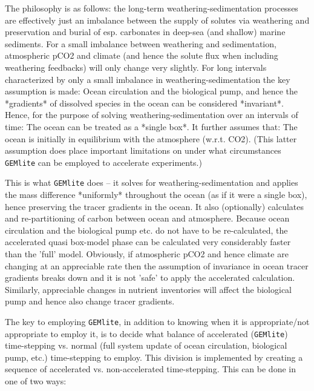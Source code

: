 \documentclass[11pt,fleqn]{book} %
\begin{document}
The philosophy is as follows: the long-term weathering-sedimentation processes are effectively just an imbalance between the supply of solutes via weathering and preservation and burial of esp. carbonates in deep-sea (and shallow) marine sediments. For a small imbalance between weathering and sedimentation, atmospheric pCO2 and climate (and hence the solute flux when including weathering feedbacks) will only change very slightly. For long intervals characterized by only a small imbalance in weathering-sedimentation the key assumption is made:
Ocean circulation and the biological pump, and hence the *gradients* of dissolved species in the ocean can be considered *invariant*.
Hence, for the purpose of solving weathering-sedimentation over an intervals of time:
The ocean can be treated as a *single box*.
It further assumes that:
The ocean is initially in equilibrium with the atmosphere (w.r.t. CO2).
(This latter assumption does place important limitations on under what circumstances \texttt{GEMlite} can be employed to accelerate experiments.)

This is what \texttt{GEMlite} does -- it solves for weathering-sedimentation and applies the mass difference *uniformly* throughout the ocean (as if it were a single box), hence preserving the tracer gradients in the ocean. It also (optionally) calculates and re-partitioning of carbon between ocean and atmosphere. Because ocean circulation and the biological pump etc. do not have to be re-calculated, the accelerated quasi box-model phase can be calculated very considerably faster than the 'full' model.
Obviously, if atmospheric pCO2 and hence climate are changing at an appreciable rate then the assumption of invariance in ocean tracer gradients breaks down and it is not 'safe' to apply the accelerated calculation. Similarly, appreciable changes in nutrient inventories will affect the biological pump and hence also change tracer gradients.

The key to employing \texttt{GEMlite}, in addition to knowing when it is appropriate/not appropriate to employ it, is to decide what balance of accelerated (\texttt{GEMlite}) time-stepping vs. normal (full system update of ocean circulation, biological pump, etc.) time-stepping to employ. This division is implemented by creating a sequence of accelerated vs. non-accelerated time-stepping. This can be done in one of two ways:
\end{document}
